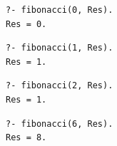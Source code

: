 \begin{lstlisting}[caption={Вопрос и ответ №4}, label={lst:q4}]
?- fibonacci(0, Res).
Res = 0.
\end{lstlisting}

\begin{lstlisting}[caption={Вопрос и ответ №5}, label={lst:q5}]
?- fibonacci(1, Res).
Res = 1.
\end{lstlisting}

\begin{lstlisting}[caption={Вопрос и ответ №6}, label={lst:q6}]
?- fibonacci(2, Res).
Res = 1.
\end{lstlisting}

\begin{lstlisting}[caption={Вопрос и ответ №7}, label={lst:q7}]
?- fibonacci(6, Res).
Res = 8.
\end{lstlisting}
